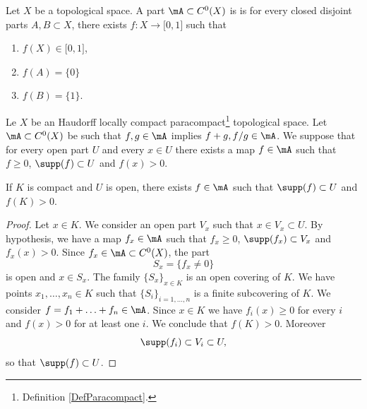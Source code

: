 \begin{definition}        \label{DEFooTUYIooCRkgDm}
	Let \( X\) be a topological space. A part \( \mA\subset C^0(X)\) is  is for every closed disjoint parts \( A,B\subset X\), there exists \( f\colon X\to \mathopen[ 0 , 1 \mathclose]\) such that
	\begin{enumerate}
		\item
		      \( f(X)\in\mathopen[ 0 , 1 \mathclose]\),
		\item
		      \( f(A)=\{ 0 \}\)
		\item
		      \( f(B)=\{ 1 \}\).
	\end{enumerate}
\end{definition}

\begin{lemma}	\label{LEMooIVULooNwymBx}
	Le \( X\) be an Haudorff locally compact paracompact\footnote{Definition \ref{DefParacompact}.} topological space. Let \( \mA\subset C^0(X)\) be such that \( f,g\in \mA\) implies \( f+g,f/g\in\mA\). We suppose that for every open part \( U\) and every \( x\in U\) there exists a map \( f\in\mA\) such that \( f\geq 0\), \( \supp(f)\subset U\) and \( f(x)>0\).

	If \( K\) is compact and \( U\) is open, there exists \( f\in\mA\) such that \( \supp(f)\subset U\) and \( f(K)>0\).
\end{lemma}

\begin{proof}
	Let \( x\in K\). We consider an open part \( V_x\) such that \( x\in V_x\subset U\). By hypothesis, we have a map \( f_x\in \mA\) such that \( f_x\geq 0\), \( \supp(f_x)\subset V_x\) and \( f_x(x)>0\). Since \( f_x\in\mA\subset C^0(X)\), the part
	\begin{equation}
		S_x=\{ f_x\neq 0 \}
	\end{equation}
	is open and \( x\in S_x\). The family \( \{ S_x \}_{x\in K}\) is an open covering of \( K\). We have points \( x_1,\ldots,x_n\in K\) such that \( \{ S_i \}_{i=1,\ldots,n}\) is a finite subcovering of \( K\). We consider \( f=f_1+\ldots+f_n\in \mA\). Since \( x\in K\) we have \( f_i(x)\geq 0\) for every \( i\) and \( f(x)>0\) for at least one \( i\). We conclude that \( f(K)>0\). Moreover
	\begin{equation}
		\supp(f_i)\subset V_i\subset U,
	\end{equation}
	so that \( \supp(f)\subset U\).
\end{proof}



